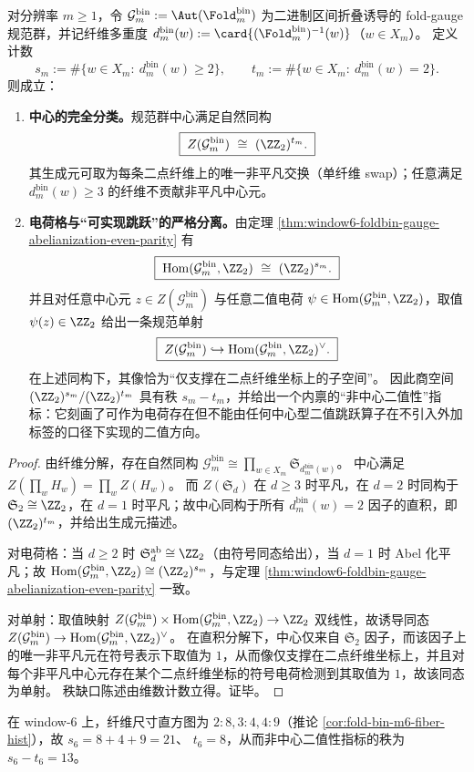 \begin{proposition}[二点纤维的中心型跳跃与非中心二值性的秩缺口]\label{prop:window6-foldbin-gauge-center-vs-charge-separation}
对分辨率 \(m\ge 1\)，令
\(
\mathcal{G}^{\mathrm{bin}}_m:=\Aut(\Fold^{\mathrm{bin}}_m)
\)
为二进制区间折叠诱导的 fold-gauge 规范群，并记纤维多重度
\(
d^{\mathrm{bin}}_m(w):=\card{(\Fold^{\mathrm{bin}}_m)^{-1}(w)}
\)（\(w\in X_m\)）。
定义计数
\[
s_m:=\#\{w\in X_m:\ d^{\mathrm{bin}}_m(w)\ge 2\},
\qquad
t_m:=\#\{w\in X_m:\ d^{\mathrm{bin}}_m(w)=2\}.
\]
则成立：
\begin{enumerate}
\normalfont
  \item \textbf{中心的完全分类。}规范群中心满足自然同构
  \[
  \boxed{\;Z(\mathcal{G}^{\mathrm{bin}}_m)\ \cong\ (\ZZ_2)^{t_m}.\;}
  \]
  其生成元可取为每条二点纤维上的唯一非平凡交换（单纤维 swap）；任意满足 \(d^{\mathrm{bin}}_m(w)\ge 3\) 的纤维不贡献非平凡中心元。
  \item \textbf{电荷格与“可实现跳跃”的严格分离。}由定理 \ref{thm:window6-foldbin-gauge-abelianization-even-parity} 有
  \[
  \boxed{\;\mathrm{Hom}(\mathcal{G}^{\mathrm{bin}}_m,\ZZ_2)\ \cong\ (\ZZ_2)^{s_m}.\;}
  \]
  并且对任意中心元 \(z\in Z(\mathcal{G}^{\mathrm{bin}}_m)\) 与任意二值电荷 \(\psi\in\mathrm{Hom}(\mathcal{G}^{\mathrm{bin}}_m,\ZZ_2)\)，取值 \(\psi(z)\in\ZZ_2\) 给出一条规范单射
  \[
  \boxed{\;Z(\mathcal{G}^{\mathrm{bin}}_m)\hookrightarrow \mathrm{Hom}(\mathcal{G}^{\mathrm{bin}}_m,\ZZ_2)^\vee.\;}
  \]
  在上述同构下，其像恰为“仅支撑在二点纤维坐标上的子空间”。
  因此商空间 \((\ZZ_2)^{s_m}/(\ZZ_2)^{t_m}\) 具有秩 \(s_m-t_m\)，并给出一个内禀的“非中心二值性”指标：它刻画了可作为电荷存在但不能由任何中心型二值跳跃算子在不引入外加标签的口径下实现的二值方向。
\end{enumerate}
\end{proposition}
\begin{proof}
由纤维分解，存在自然同构
\(
\mathcal{G}^{\mathrm{bin}}_m\cong \prod_{w\in X_m}\mathfrak S_{d^{\mathrm{bin}}_m(w)}
\)。
中心满足
\(
Z(\prod_w H_w)=\prod_w Z(H_w)
\)。
而 \(Z(\mathfrak S_d)\) 在 \(d\ge 3\) 时平凡，在 \(d=2\) 时同构于 \(\mathfrak S_2\cong\ZZ_2\)，在 \(d=1\) 时平凡；故中心同构于所有 \(d^{\mathrm{bin}}_m(w)=2\) 因子的直积，即 \((\ZZ_2)^{t_m}\)，并给出生成元描述。
\par
对电荷格：当 \(d\ge 2\) 时 \(\mathfrak S_d^{\mathrm{ab}}\cong\ZZ_2\)（由符号同态给出），当 \(d=1\) 时 Abel 化平凡；故
\(
\mathrm{Hom}(\mathcal{G}^{\mathrm{bin}}_m,\ZZ_2)\cong (\ZZ_2)^{s_m}
\)，与定理 \ref{thm:window6-foldbin-gauge-abelianization-even-parity} 一致。
\par
对单射：取值映射
\(
Z(\mathcal{G}^{\mathrm{bin}}_m)\times \mathrm{Hom}(\mathcal{G}^{\mathrm{bin}}_m,\ZZ_2)\to \ZZ_2
\)
双线性，故诱导同态
\(
Z(\mathcal{G}^{\mathrm{bin}}_m)\to \mathrm{Hom}(\mathcal{G}^{\mathrm{bin}}_m,\ZZ_2)^\vee
\)。
在直积分解下，中心仅来自 \(\mathfrak S_2\) 因子，而该因子上的唯一非平凡元在符号表示下取值为 \(1\)，从而像仅支撑在二点纤维坐标上，并且对每个非平凡中心元存在某个二点纤维坐标的符号电荷检测到其取值为 \(1\)，故该同态为单射。
秩缺口陈述由维数计数立得。证毕。
\end{proof}

\begin{remark}\label{rem:window6-foldbin-noncentral-binary-rank-gap}
在 window-\(6\) 上，纤维尺寸直方图为 \(2:8,3:4,4:9\)（推论 \ref{cor:fold-bin-m6-fiber-hist}），故
\(
s_6=8+4+9=21
\)、
\(
t_6=8
\)，从而非中心二值性指标的秩为 \(s_6-t_6=13\)。
\end{remark}

\endinput
